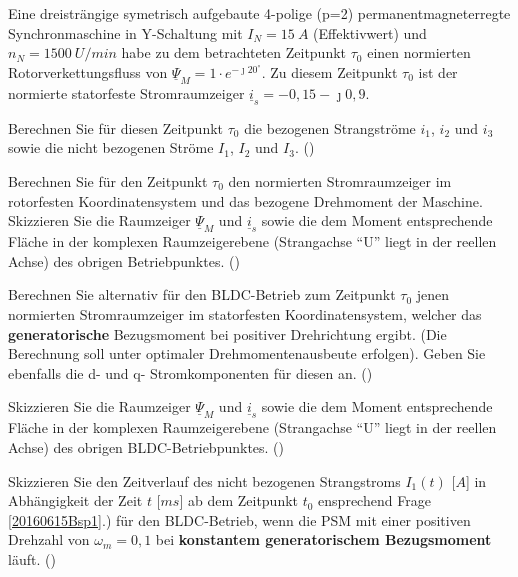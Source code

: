 \begin{question}[section=1,name={15.06.2016},mode=exm,type=bsp,tags={20160615}]
	Eine dreisträngige symetrisch aufgebaute 4-polige (p=2) permanentmagneterregte Synchronmaschine in Y-Schaltung mit $I_N = 15~A$ (Effektivwert) und $n_N= 1500~U/min$ habe zu dem betrachteten Zeitpunkt $\tau_0$ einen normierten Rotorverkettungsfluss von $\underline{\Psi}_M = 1 \cdot e^{-\jmath 20 ^\circ}$. Zu diesem Zeitpunkt $\tau_0$ ist der normierte statorfeste Stromraumzeiger $\underline{i}_s = -0,15 -\jmath0,9$.
	\begin{compactenum}
		\item Berechnen Sie für diesen Zeitpunkt $\tau_0$ die bezogenen Strangströme $i_1$, $i_2$ und $i_3$ sowie die nicht bezogenen Ströme $I_1$, $I_2$ und $I_3$. ()
		\item Berechnen Sie für den Zeitpunkt $\tau_0$ den normierten Stromraumzeiger im rotorfesten Koordinatensystem und das bezogene Drehmoment der Maschine. Skizzieren Sie die Raumzeiger $\underline{\Psi}_M$ und $\underline{i}_s$ sowie die dem Moment entsprechende Fläche in der komplexen Raumzeigerebene (Strangachse ``U'' liegt in der reellen Achse) des obrigen Betriebpunktes. ()
		\item Berechnen Sie alternativ für den BLDC-Betrieb zum Zeitpunkt $\tau_0$ jenen normierten Stromraumzeiger im statorfesten Koordinatensystem, welcher das \textbf{generatorische} Bezugsmoment bei positiver Drehrichtung ergibt. (Die Berechnung soll unter optimaler Drehmomentenausbeute erfolgen). Geben Sie ebenfalls die d- und q- Stromkomponenten für diesen an. () \label{20160615Bsp1}
		\item Skizzieren Sie die Raumzeiger $\underline{\Psi}_M$ und $\underline{i}_s$ sowie die dem Moment entsprechende Fläche in der komplexen Raumzeigerebene (Strangachse ``U'' liegt in der reellen Achse) des obrigen BLDC-Betriebpunktes. ()
		\item Skizzieren Sie den Zeitverlauf des nicht bezogenen Strangstroms $I_1(t)$ [$A$] in Abhängigkeit der Zeit $t$ [$ms$] ab dem Zeitpunkt $t_0$ ensprechend Frage \ref{20160615Bsp1}.) für den BLDC-Betrieb, wenn die PSM mit einer positiven Drehzahl von $\omega_m = 0,1$ bei \textbf{konstantem generatorischem Bezugsmoment} läuft. ()
	\end{compactenum}
\end{question}
